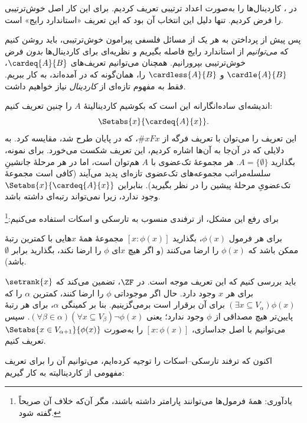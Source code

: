 \documentclass[../../../include/open-logic-section]{subfiles}
\begin{document}

در ، کاردینال‌ها را
به‌صورت اعداد ترتیبی تعریف کردیم. برای این کار اصل خوش‌ترتیبی را فرض
کردیم. تنها دلیل این انتخاب آن بود که این تعریف «استاندارد رایج» است.

پس پیش از پرداختن به هر یک از مسائل فلسفی پیرامون خوش‌ترتیبی، باید روشن
کنیم که \emph{می‌توانیم} از استاندارد رایج فاصله بگیریم و نظریه‌ای برای
کاردینال‌ها \emph{بدون} فرض خوش‌ترتیبی بپرورانیم. همچنان می‌توانیم
تعریف‌های $\cardeq{A}{B}$، $\cardle{A}{B}$ و $\cardless{A}{B}$ را،
همان‌گونه که در  آمده‌اند، به کار ببریم. فقط به
مفهوم تازه‌ای از \emph{کاردینال} نیاز خواهیم داشت.

اندیشه‌ای ساده‌انگارانه این است که بکوشیم کاردینالیتهٔ $A$ را چنین تعریف
کنیم:
\[
	\Setabs{x}{\cardeq{A}{x}}.
\]
این تعریف را می‌توان با تعریف فرگه از $\# x Fx$، که در پایان
 طرح شد، مقایسه کرد. به دلایلی که در آن‌جا به
آن‌ها اشاره کردیم، این تعریف شکست می‌خورد. برای نمونه، بگذارید
$A=\{\emptyset\}$. هر مجموعهٔ تک‌عضوی با $A$ هم‌توان است، اما در هر
مرحلهٔ جانشینِ سلسله‌مراتب مجموعه‌های تک‌عضوی تازه‌ای پدید می‌آیند
(کافی است مجموعهٔ تک‌عضویِ مرحلهٔ پیشین را در نظر بگیرید). بنابراین
$\Setabs{x}{\cardeq{A}{x}}$ وجود ندارد، زیرا نمی‌تواند رتبه‌ای داشته
باشد.

برای رفع این مشکل، از ترفندی منسوب به تارسکی و اسکات استفاده
می‌کنیم:\footnote{یادآوری: همهٔ فرمول‌ها می‌توانند پارامتر داشته باشند،
مگر آن‌که خلاف آن صریحاً گفته شود.}

\begin{defn}
برای هر فرمول $\phi(x)$، بگذارید $[ x : \phi(x)] $ مجموعهٔ همهٔ
$x$هایی با کمترین رتبهٔ ممکن باشد که $\phi(x)$ را ارضا می‌کنند (و اگر
هیچ $x$ای $\phi$ را ارضا نکند، بگذارید برابر $\emptyset$ باشد).
\end{defn}

باید بررسی کنیم که این تعریف موجه است. در $\ZF$،
 تضمین می‌کند که
$\setrank{x}$ برای هر $x$ وجود دارد. حال اگر موجوداتی $\phi$ را ارضا
کنند، کمترین $\alpha$ را که
$(\exists x\subseteq V_\alpha)\phi(x)$ برای آن برقرار است برمی‌گزینیم.
بنا بر کمینگی $\alpha$، برای هر رتبهٔ پایین‌تر هیچ مصداقی از $\phi$
وجود ندارد؛ یعنی
$(\forall \beta \in \alpha)(\forall x \subseteq V_\beta)
\lnot \phi(x)$. سپس می‌توانیم با اصل جداسازی،
$[x : \phi(x)]$ را به‌صورت
$\Setabs{x \in V_{\alpha+1}}{\phi(x)}$ تعریف کنیم.

اکنون که ترفند تارسکی--اسکات را توجیه کرده‌ایم، می‌توانیم آن را برای
تعریف مفهومی از کاردینالیته به کار گیریم:
\end{document}
